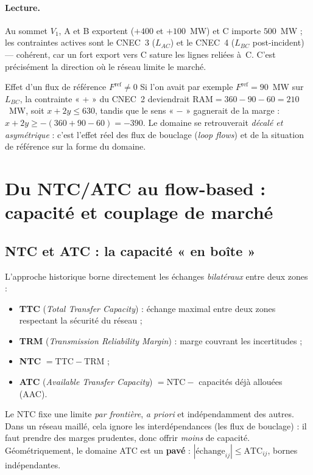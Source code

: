 \documentclass[11pt,a4paper]{article}
\newcommand{\RAM}{\mathrm{RAM}}
\newcommand{\Fref}{F^{\mathrm{ref}}}
\begin{document}
\paragraph{Lecture.} Au sommet $V_1$, A et B exportent
($+400$ et $+100$~MW) et C importe $500$~MW ; les contraintes actives sont
le CNEC~3 ($L_{AC}$) et le CNEC~4 ($L_{BC}$ post-incident) — cohérent, car
un fort export vers C sature les lignes reliées à~C. C'est précisément la
direction où le réseau limite le marché.

\begin{rembox}{Effet d'un flux de référence $\Fref \neq 0$}
Si l'on avait par exemple $\Fref = 90$~MW sur $L_{BC}$, la contrainte « + »
du CNEC~2 deviendrait $\RAM = 360-90-60 = 210$~MW, soit
$x + 2y \le 630$, tandis que le sens « $-$ » gagnerait de la marge :
$x + 2y \ge -(360+90-60) = -390$. Le domaine se retrouverait
\emph{décalé et asymétrique} : c'est l'effet réel des flux de bouclage
(\emph{loop flows}) et de la situation de référence sur la forme du domaine.
\end{rembox}

\section{Du NTC/ATC au flow-based : capacité et couplage de marché}
\label{sec:coupling}

\subsection{NTC et ATC : la capacité « en boîte »}

L'approche historique borne directement les échanges \emph{bilatéraux} entre
deux zones :
\begin{itemize}[nosep,leftmargin=1.4em]
  \item \textbf{TTC} (\emph{Total Transfer Capacity}) : échange maximal entre
        deux zones respectant la sécurité du réseau ;
  \item \textbf{TRM} (\emph{Transmission Reliability Margin}) : marge couvrant
        les incertitudes ;
  \item \textbf{NTC} $= \mathrm{TTC}-\mathrm{TRM}$ ;
  \item \textbf{ATC} (\emph{Available Transfer Capacity}) $=\mathrm{NTC}-$
        capacités déjà allouées (AAC).
\end{itemize}
Le NTC fixe une limite \emph{par frontière}, \emph{a priori} et indépendamment
des autres. Dans un réseau maillé, cela ignore les interdépendances (les flux
de bouclage) : il faut prendre des marges prudentes, donc offrir \emph{moins}
de capacité. Géométriquement, le domaine ATC est un \textbf{pavé} :
$|\text{échange}_{ij}|\le \mathrm{ATC}_{ij}$, bornes indépendantes.
\end{document}
